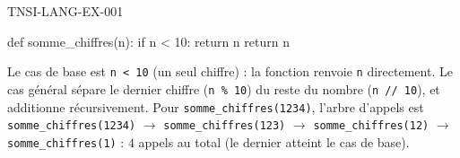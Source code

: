 \begin{corrige}{TNSI-LANG-EX-001}
\begin{python}
def somme_chiffres(n):
    if n < 10:
        return n
    return n %
\end{python}
Le cas de base est \lstinline{n < 10} (un seul chiffre) : la fonction renvoie \lstinline{n} directement. Le cas général sépare le dernier chiffre (\lstinline{n % 10}) du reste du nombre (\lstinline{n // 10}), et additionne récursivement. Pour \lstinline{somme_chiffres(1234)}, l'arbre d'appels est \lstinline{somme_chiffres(1234)} $\to$ \lstinline{somme_chiffres(123)} $\to$ \lstinline{somme_chiffres(12)} $\to$ \lstinline{somme_chiffres(1)} : $4$ appels au total (le dernier atteint le cas de base).
\end{corrige}
